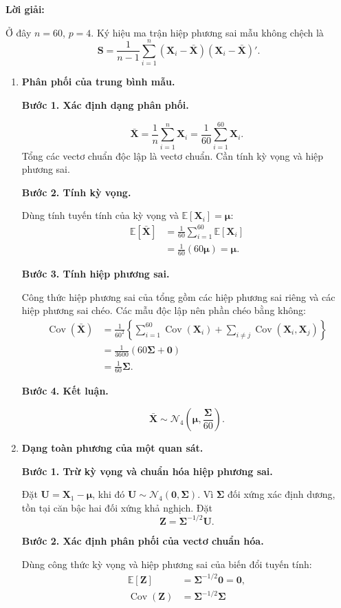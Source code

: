 \documentclass[11pt,a4paper]{article}
\renewcommand{\boldsymbol}[1]{\symbf{#1}}
\newenvironment{solution}{%
  \par\medskip\noindent\textbf{Lời giải:}\par\nopagebreak[4]\smallskip\noindent\ignorespaces
}{\par}
\newcommand{\answer}[1]{\boxed{#1}}
\newcommand{\step}[2]{\par\medskip\noindent\textbf{Bước #1. #2}\par\nopagebreak[4]\smallskip\noindent}
\begin{document}
\begin{solution}
Ở đây $n=60$, $p=4$. Ký hiệu ma trận hiệp phương sai mẫu không chệch là
\[
\mathbf{S}=\frac1{n-1}\sum_{i=1}^n
(\mathbf{X}_i-\bar{\mathbf{X}})(\mathbf{X}_i-\bar{\mathbf{X}})'.
\]
\begin{enumerate}[label=\textbf{\alph*)}]
\item \textbf{Phân phối của trung bình mẫu.}\par\nopagebreak[4]
\step{1}{Xác định dạng phân phối.}
\[
\bar{\mathbf{X}}=\frac1n\sum_{i=1}^n\mathbf{X}_i
=\frac1{60}\sum_{i=1}^{60}\mathbf{X}_i.
\]
Tổng các vectơ chuẩn độc lập là vectơ chuẩn. Cần tính kỳ vọng và hiệp phương sai.
\step{2}{Tính kỳ vọng.}
Dùng tính tuyến tính của kỳ vọng và $\mathbb{E}[\mathbf{X}_i]=\boldsymbol{\mu}$:
\begin{align*}
\mathbb{E}[\bar{\mathbf{X}}]
&=\frac1{60}\sum_{i=1}^{60}\mathbb{E}[\mathbf{X}_i]\\
&=\frac1{60}(60\boldsymbol{\mu})=\boldsymbol{\mu}.
\end{align*}
\step{3}{Tính hiệp phương sai.}
Công thức hiệp phương sai của tổng gồm các hiệp phương sai riêng và các
hiệp phương sai chéo. Các mẫu độc lập nên phần chéo bằng không:
\begin{align*}
\operatorname{Cov}(\bar{\mathbf{X}})
&=\frac1{60^2}\left\{\sum_{i=1}^{60}\operatorname{Cov}(\mathbf{X}_i)
+\sum_{i\ne j}\operatorname{Cov}(\mathbf{X}_i,\mathbf{X}_j)\right\}\\
&=\frac1{3600}(60\boldsymbol{\Sigma}+\mathbf{0})\\
&=\frac1{60}\boldsymbol{\Sigma}.
\end{align*}
\step{4}{Kết luận.}
\[
\bar{\mathbf{X}}\sim\answer{\mathcal{N}_4
\left(\boldsymbol{\mu},\frac{\boldsymbol{\Sigma}}{60}\right)}.
\]
\item \textbf{Dạng toàn phương của một quan sát.}\par\nopagebreak[4]
\step{1}{Trừ kỳ vọng và chuẩn hóa hiệp phương sai.}
Đặt $\mathbf{U}=\mathbf{X}_1-\boldsymbol{\mu}$, khi đó
$\mathbf{U}\sim\mathcal{N}_4(\mathbf{0},\boldsymbol{\Sigma})$.
Vì $\boldsymbol{\Sigma}$ đối xứng xác định dương, tồn tại căn bậc hai đối xứng
khả nghịch. Đặt
\[
\mathbf{Z}=\boldsymbol{\Sigma}^{-1/2}\mathbf{U}.
\]
\step{2}{Xác định phân phối của vectơ chuẩn hóa.}
Dùng công thức kỳ vọng và hiệp phương sai của biến đổi tuyến tính:
\begin{align*}
\mathbb{E}[\mathbf{Z}]&=\boldsymbol{\Sigma}^{-1/2}\mathbf{0}=\mathbf{0},\\
\operatorname{Cov}(\mathbf{Z})
&=\boldsymbol{\Sigma}^{-1/2}\boldsymbol{\Sigma}

\end{align*}
\end{enumerate}
\end{solution}
\end{document}
